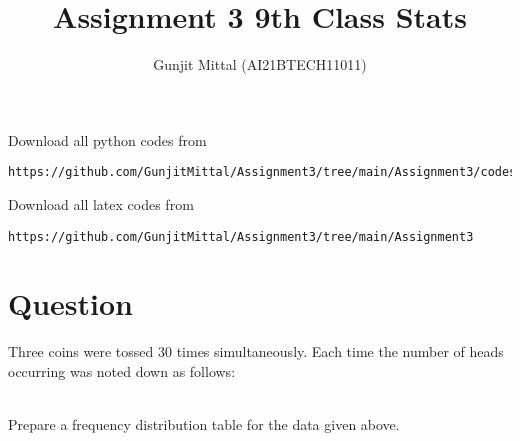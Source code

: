 \documentclass[journal,12pt,twocolumn]{IEEEtran}
\begin{document}
\let\vec\mathbf{}
\def\putbox#1#2#3{\makebox[0in][l]{\makebox[#1][l]{}\raisebox{\baselineskip}[0in][0in]{\raisebox{#2}[0in][0in]{#3}}}}
     \def\rightbox#1{\makebox[0in][r]{#1}}
     \def\centbox#1{\makebox[0in]{#1}}
     \def\topbox#1{\raisebox{-\baselineskip}[0in][0in]{#1}}
     \def\midbox#1{\raisebox{-0.5\baselineskip}[0in][0in]{#1}}
\vspace{3cm}
\title{Assignment 3 9th Class Stats}
\author{Gunjit Mittal (AI21BTECH11011)}
\maketitle
Download all python codes from 
\begin{lstlisting}
https://github.com/GunjitMittal/Assignment3/tree/main/Assignment3/codes
\end{lstlisting}
Download all latex codes from 
\begin{lstlisting}
https://github.com/GunjitMittal/Assignment3/tree/main/Assignment3 
\end{lstlisting} 
\section{Question}
Three coins were tossed 30 times simultaneously. Each time the number of heads
occurring was noted down as follows:\\  
\begin{table}[ht!]
    \centering
    \label{table:table1}	 
\end{table}   \\
Prepare a frequency distribution table for the data given above.\\
\end{document}
